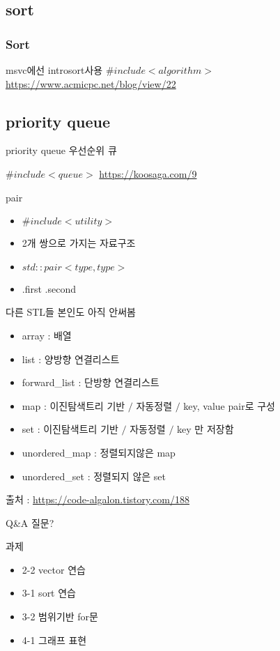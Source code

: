\documentclass[10pt]{beamer}
\begin{document}
\subsection{sort}


\begin{frame}
    
    \frametitle{Sort}

    msvc에선 introsort사용
    $\#include<algorithm>$
    \url{https://www.acmicpc.net/blog/view/22}

\end{frame}

\subsection{priority queue}

\begin{frame}{priority queue 우선순위 큐}
    
    $\#include<queue>$
    \url{https://koosaga.com/9}
    
\end{frame}

\begin{frame}{pair}

    \begin{itemize}
        \item $\#include<utility>$
        \item 2개 쌍으로 가지는 자료구조 
        \item $std::pair<type,type>$
        \item .first .second
    \end{itemize}
\end{frame}


\begin{frame}{다른 STL들}
    본인도 아직 안써봄
    \begin{itemize}
        \item array : 배열
        \item list : 양방향 연결리스트
        \item forward\_list : 단방향 연결리스트
        \item map : 이진탐색트리 기반 $/$ 자동정렬 $/$ key, value pair로 구성
        \item set : 이진탐색트리 기반 $/$ 자동정렬 $/$ key 만 저장함
        \item unordered\_map : 정렬되지않은 map
        \item unordered\_set : 정렬되지 않은 set
    \end{itemize}

    출처 : \url{https://code-algalon.tistory.com/188}

\end{frame}

\begin{frame}{Q\&A}
    질문?
\end{frame}

\begin{frame}{과제}
    \begin{itemize}
        \item 2-2 vector 연습
        \item 3-1 sort 연습 
        \item 3-2 범위기반 for문
        \item 4-1 그래프 표현
    \end{itemize}
\end{frame}
\end{document}

